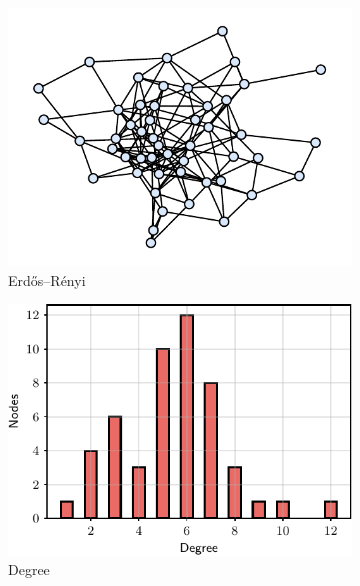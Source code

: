 \begin{figure}[t]
    \centering
    \begin{subfigure}[b]{0.24\textwidth}
    \includegraphics[width=\textwidth]{images/graph_1}
    \caption{Erdős–Rényi}
    \end{subfigure}
    \begin{subfigure}[b]{0.24\textwidth}
    \includegraphics[width=\textwidth]{images/graph_1_degree}
    \caption{Degree}
    \end{subfigure}
    \begin{subfigure}[b]{0.24\textwidth}

\end{subfigure}
\end{figure}
